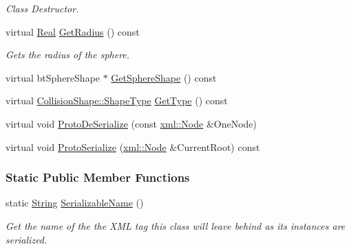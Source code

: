 \begin{DoxyCompactItemize}
\begin{DoxyCompactList}\small\item\em Class Destructor. \item\end{DoxyCompactList}\item 
virtual \hyperlink{namespaceMezzanine_a726731b1a7df72bf3583e4a97282c6f6}{Real} \hyperlink{classMezzanine_1_1SphereCollisionShape_aaebd4bf8c8f42e59c4f25e61d7571581}{GetRadius} () const 
\begin{DoxyCompactList}\small\item\em Gets the radius of the sphere. \item\end{DoxyCompactList}\item 
virtual btSphereShape $\ast$ \hyperlink{classMezzanine_1_1SphereCollisionShape_aaae77c39b360ac6d1c7c8f0f4a09f530}{GetSphereShape} () const 
\item 
virtual \hyperlink{classMezzanine_1_1CollisionShape_ad04186055565998879b64176d6dd100d}{CollisionShape::ShapeType} \hyperlink{classMezzanine_1_1SphereCollisionShape_ad2c8d33b21fe7215742db4551429c5a6}{GetType} () const 
\item 
virtual void \hyperlink{classMezzanine_1_1SphereCollisionShape_a3504227628734579055f242b1ace4d74}{ProtoDeSerialize} (const \hyperlink{classMezzanine_1_1xml_1_1Node}{xml::Node} \&OneNode)
\item 
virtual void \hyperlink{classMezzanine_1_1SphereCollisionShape_a5d960502c435c80d6ce45bc409e90d94}{ProtoSerialize} (\hyperlink{classMezzanine_1_1xml_1_1Node}{xml::Node} \&CurrentRoot) const 
\end{DoxyCompactItemize}
\subsubsection*{Static Public Member Functions}
\begin{DoxyCompactItemize}
\item 
static \hyperlink{namespaceMezzanine_acf9fcc130e6ebf08e3d8491aebcf1c86}{String} \hyperlink{classMezzanine_1_1SphereCollisionShape_a41c14d2a29a4ed2f0d5fe6fd386ab71e}{SerializableName} ()
\begin{DoxyCompactList}\small\item\em Get the name of the the XML tag this class will leave behind as its instances are serialized. \item\end{DoxyCompactList}\end{DoxyCompactItemize}


